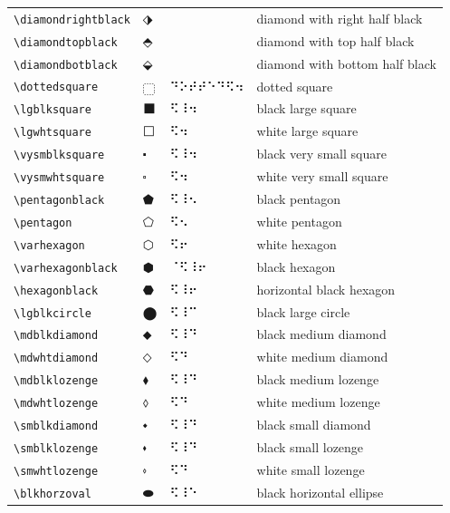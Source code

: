 \documentclass[oneside]{article}
\begin{document}
\begin{longtable}{llll}
\verb|\diamondrightblack| & $\diamondrightblack$ &    & {diamond with right half black} \\[2ex]
\verb|\diamondtopblack| & $\diamondtopblack$ &    & {diamond with top half black} \\[2ex]
\verb|\diamondbotblack| & $\diamondbotblack$ &    & {diamond with bottom half black} \\[2ex]
\verb|\dottedsquare| & $\dottedsquare$ &   ⠙⠕⠞⠞⠑⠙⠫⠲   & {dotted square} \\[2ex]
\verb|\lgblksquare| & $\lgblksquare$ &  ⠫⠸⠲  & {black large square} \\[2ex]
\verb|\lgwhtsquare| & $\lgwhtsquare$ &  ⠫⠲  & {white large square} \\[2ex]
\verb|\vysmblksquare| & $\vysmblksquare$ &  ⠫⠸⠲  & {black very small square} \\[2ex]
\verb|\vysmwhtsquare| & $\vysmwhtsquare$ &  ⠫⠲  & {white very small square} \\[2ex]
\verb|\pentagonblack| & $\pentagonblack$ &  ⠫⠸⠢  & {black pentagon} \\[2ex]
\verb|\pentagon| & $\pentagon$ &  ⠫⠢  & {white pentagon} \\[2ex]
\verb|\varhexagon| & $\varhexagon$ &  ⠫⠖  & {white hexagon} \\[2ex]
\verb|\varhexagonblack| & $\varhexagonblack$ &  ⠈⠫⠸⠖  & {black hexagon} \\[2ex]
\verb|\hexagonblack| & $\hexagonblack$ &  ⠫⠸⠖  & {horizontal black hexagon} \\[2ex]
\verb|\lgblkcircle| & $\lgblkcircle$ &  ⠫⠸⠉  & {black large circle} \\[2ex]
\verb|\mdblkdiamond| & $\mdblkdiamond$ &  ⠫⠸⠙  & {black medium diamond} \\[2ex]
\verb|\mdwhtdiamond| & $\mdwhtdiamond$ &  ⠫⠙  & {white medium diamond} \\[2ex]
\verb|\mdblklozenge| & $\mdblklozenge$ &  ⠫⠸⠙  & {black medium lozenge} \\[2ex]
\verb|\mdwhtlozenge| & $\mdwhtlozenge$ &  ⠫⠙  & {white medium lozenge} \\[2ex]
\verb|\smblkdiamond| & $\smblkdiamond$ &  ⠫⠸⠙  & {black small diamond} \\[2ex]
\verb|\smblklozenge| & $\smblklozenge$ &  ⠫⠸⠙  & {black small lozenge} \\[2ex]
\verb|\smwhtlozenge| & $\smwhtlozenge$ &  ⠫⠙  & {white small lozenge} \\[2ex]
\verb|\blkhorzoval| & $\blkhorzoval$ &  ⠫⠸⠑  & {black horizontal ellipse} \\[2ex]

\end{longtable}
\end{document}
